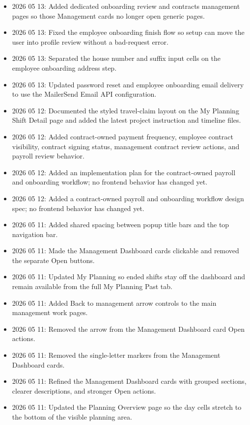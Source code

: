 \documentclass[11pt]{article}
\begin{document}
\begin{itemize}
    \item 2026 05 13: Added dedicated onboarding review and contracts management pages so those Management cards no longer open generic pages.
    \item 2026 05 13: Fixed the employee onboarding finish flow so setup can move the user into profile review without a bad-request error.
    \item 2026 05 13: Separated the house number and suffix input cells on the employee onboarding address step.
    \item 2026 05 13: Updated password reset and employee onboarding email delivery to use the MailerSend Email API configuration.
    \item 2026 05 12: Documented the styled travel-claim layout on the My Planning Shift Detail page and added the latest project instruction and timeline files.
    \item 2026 05 12: Added contract-owned payment frequency, employee contract visibility, contract signing status, management contract review actions, and payroll review behavior.
    \item 2026 05 12: Added an implementation plan for the contract-owned payroll and onboarding workflow; no frontend behavior has changed yet.
    \item 2026 05 12: Added a contract-owned payroll and onboarding workflow design spec; no frontend behavior has changed yet.
    \item 2026 05 11: Added shared spacing between popup title bars and the top navigation bar.
    \item 2026 05 11: Made the Management Dashboard cards clickable and removed the separate Open buttons.
    \item 2026 05 11: Updated My Planning so ended shifts stay off the dashboard and remain available from the full My Planning Past tab.
    \item 2026 05 11: Added Back to management arrow controls to the main management work pages.
    \item 2026 05 11: Removed the arrow from the Management Dashboard card Open actions.
    \item 2026 05 11: Removed the single-letter markers from the Management Dashboard cards.
    \item 2026 05 11: Refined the Management Dashboard cards with grouped sections, clearer descriptions, and stronger Open actions.
    \item 2026 05 11: Updated the Planning Overview page so the day cells stretch to the bottom of the visible planning area.

\end{itemize}
\end{document}
